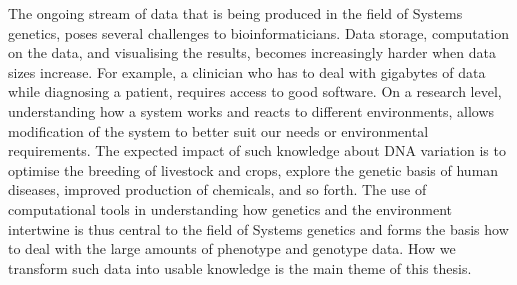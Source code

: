 The ongoing stream of data that is being produced in the field of Systems genetics, poses several 
challenges to bioinformaticians. Data storage, computation on the data, and visualising the results, 
becomes increasingly harder when data sizes increase. For example, a clinician who has to deal with 
gigabytes of data while diagnosing a patient, requires access to good software. On a research level, 
understanding how a system works and reacts to different environments, allows modification of the system 
to better suit our needs or environmental requirements. The expected impact of such knowledge about DNA 
variation is to optimise  the breeding of livestock and crops, explore the genetic basis of human diseases, 
improved production of chemicals, and so forth. The use of computational tools in understanding how 
genetics and the environment intertwine is thus central to the field of Systems genetics and forms the 
basis how to deal with the large amounts of phenotype and genotype data. How we transform such data into 
usable knowledge is the main theme of this thesis.

